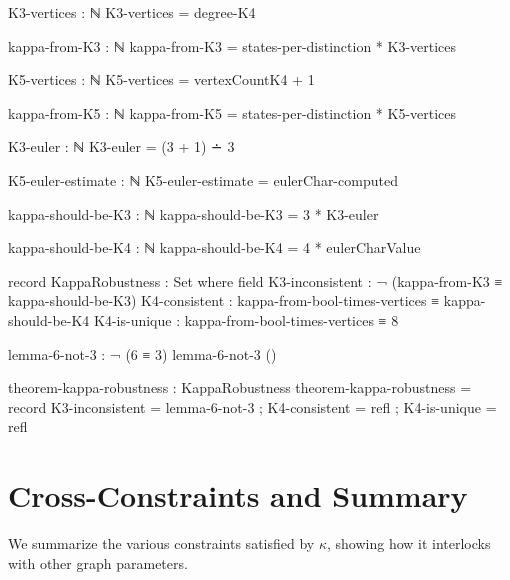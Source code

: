 \documentclass[11pt,a4paper]{book}
\begin{document}
\begin{code}
K3-vertices : ℕ
K3-vertices = degree-K4

kappa-from-K3 : ℕ
kappa-from-K3 = states-per-distinction * K3-vertices

K5-vertices : ℕ
K5-vertices = vertexCountK4 + 1

kappa-from-K5 : ℕ
kappa-from-K5 = states-per-distinction * K5-vertices

K3-euler : ℕ
K3-euler = (3 + 1) ∸ 3

K5-euler-estimate : ℕ
K5-euler-estimate = eulerChar-computed

kappa-should-be-K3 : ℕ
kappa-should-be-K3 = 3 * K3-euler
\end{code}

\begin{code}
kappa-should-be-K4 : ℕ
kappa-should-be-K4 = 4 * eulerCharValue

record KappaRobustness : Set where
  field
    K3-inconsistent : ¬ (kappa-from-K3 ≡ kappa-should-be-K3)
    K4-consistent   : kappa-from-bool-times-vertices ≡ kappa-should-be-K4
    K4-is-unique    : kappa-from-bool-times-vertices ≡ 8

lemma-6-not-3 : ¬ (6 ≡ 3)
lemma-6-not-3 ()

theorem-kappa-robustness : KappaRobustness
theorem-kappa-robustness = record
  { K3-inconsistent = lemma-6-not-3
  ; K4-consistent   = refl
  ; K4-is-unique    = refl
  }
\end{code}

\section{Cross-Constraints and Summary}

We summarize the various constraints satisfied by $\kappa$, showing how it interlocks with other graph parameters.
\end{document}
